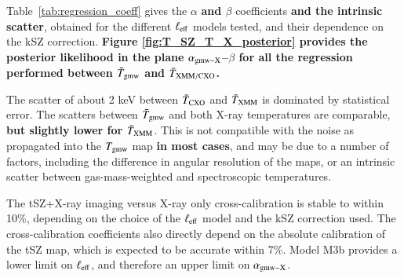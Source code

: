 \documentclass[twocolumn,traditabstract]{aa}
\begin{document}
Table~\ref{tab:regression_coeff} gives the $\alpha $ {\bf and $\beta$} coefficients {\bf and the intrinsic scatter}, obtained for the different $\ell_{\rm eff}$ models tested, and their dependence on the kSZ correction. {\bf Figure \ref{fig:T_SZ_T_X_posterior} provides the posterior likelihood in the plane $\alpha_{\rm gmw-X}$--$\beta$ for all the regression performed between $\bar{T}_{\rm gmw}$ and $\bar{T}_{\rm XMM/CXO}$.}

The scatter of about 2 keV between $\bar{T}_{\rm CXO}$ and $\bar{T}_{\rm XMM}$ is dominated by statistical error. The scatters between $\bar{T}_{\rm gmw}$ and both X-ray temperatures are comparable, {\bf but slightly lower for $\bar{T}_{\rm XMM}$}. This is not compatible with the noise as propagated into the $T_{\rm gmw}$ map {\bf in most cases}, and may be due to a number of factors, including the difference in angular resolution of the maps, or an intrinsic scatter between gas-mass-weighted and spectroscopic temperatures.

The tSZ+X-ray imaging versus X-ray only cross-calibration is stable to within 10\%, depending on the choice of the $\ell_{\rm eff}$ model and the kSZ correction used. The cross-calibration coefficients also directly depend on the absolute calibration of the tSZ map, which is expected to be accurate within 7\%. Model M3b provides a lower limit on $\ell_{\rm eff}$, and therefore an upper limit on $\alpha_{\rm gmw-X}$.
\end{document}

